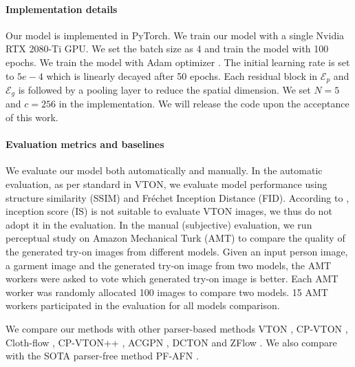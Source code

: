 \documentclass[10pt,twocolumn,letterpaper]{article}
\begin{document}
\paragraph{Implementation details} Our model is implemented in PyTorch. We train our model with a single Nvidia RTX 2080-Ti GPU. We set the batch size as 4 and train the model with 100 epochs. We train the model with Adam optimizer \cite{kingma2014adam}. The initial learning rate is set to $5e-4$ which is linearly decayed after 50 epochs. Each residual block in $\mathcal{E}_{p}$ and $\mathcal{E}_{g}$ is followed by a pooling layer to reduce the spatial dimension. We set $N=5$ and $c=256$ in the implementation. We will release the code upon the acceptance of this work.
\vspace{-0.4cm}
\paragraph{Evaluation metrics and baselines} We evaluate our model both automatically and manually. In the automatic evaluation, as per standard in VTON, we evaluate model performance using structure similarity (SSIM) \cite{wang2004image} and Fr\'{e}chet Inception Distance (FID)\cite{heusel2017gans}. According to \cite{rosca2017variational,ge2021parser}, inception score (IS) \cite{salimans2016improved} is not suitable to evaluate VTON images, we thus do not adopt it in the evaluation. In the manual (subjective) evaluation, we run perceptual study on
Amazon Mechanical Turk (AMT) to compare the quality
of the generated try-on images from different models. Given an  input person image, a garment image and the generated try-on image from two models, the AMT workers were asked to vote which generated try-on image is better. Each AMT worker was randomly allocated 100 images to compare two models. 15 AMT workers participated in the evaluation for all models comparison.

We compare our methods with other parser-based methods VTON \cite{han2018viton}, CP-VTON \cite{wang2018toward}, Cloth-flow \cite{han2019clothflow}, CP-VTON++ \cite{minar2020cp}, ACGPN \cite{yang2020towards}, DCTON \cite{ge2021disentangled} and ZFlow \cite{chopra2021zflow}. We also compare with the SOTA parser-free method PF-AFN \cite{ge2021parser}. 
\vspace{-0.4cm}
\end{document}
